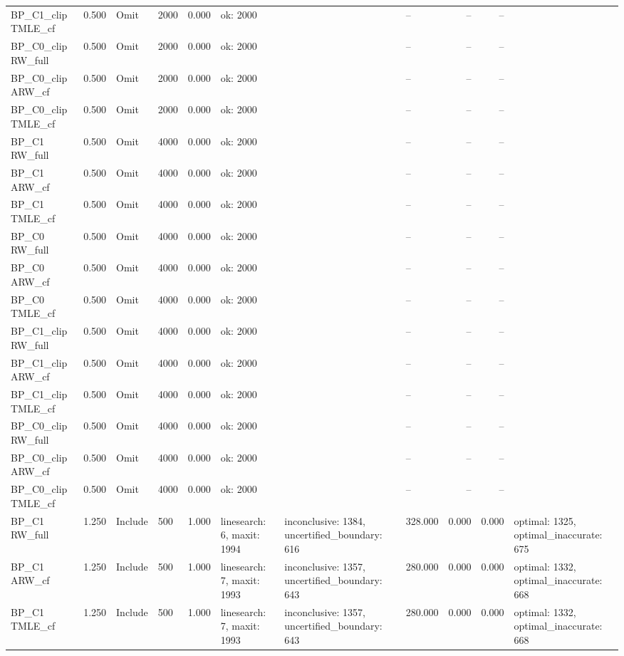 \begin{tabular}{llllrlllrrl}
BP\_C1\_clip TMLE\_cf & 0.500 & Omit & 2000 & 0.000 & ok: 2000 &  & -- & -- & -- &  \\
BP\_C0\_clip RW\_full & 0.500 & Omit & 2000 & 0.000 & ok: 2000 &  & -- & -- & -- &  \\
BP\_C0\_clip ARW\_cf & 0.500 & Omit & 2000 & 0.000 & ok: 2000 &  & -- & -- & -- &  \\
BP\_C0\_clip TMLE\_cf & 0.500 & Omit & 2000 & 0.000 & ok: 2000 &  & -- & -- & -- &  \\
BP\_C1 RW\_full & 0.500 & Omit & 4000 & 0.000 & ok: 2000 &  & -- & -- & -- &  \\
BP\_C1 ARW\_cf & 0.500 & Omit & 4000 & 0.000 & ok: 2000 &  & -- & -- & -- &  \\
BP\_C1 TMLE\_cf & 0.500 & Omit & 4000 & 0.000 & ok: 2000 &  & -- & -- & -- &  \\
BP\_C0 RW\_full & 0.500 & Omit & 4000 & 0.000 & ok: 2000 &  & -- & -- & -- &  \\
BP\_C0 ARW\_cf & 0.500 & Omit & 4000 & 0.000 & ok: 2000 &  & -- & -- & -- &  \\
BP\_C0 TMLE\_cf & 0.500 & Omit & 4000 & 0.000 & ok: 2000 &  & -- & -- & -- &  \\
BP\_C1\_clip RW\_full & 0.500 & Omit & 4000 & 0.000 & ok: 2000 &  & -- & -- & -- &  \\
BP\_C1\_clip ARW\_cf & 0.500 & Omit & 4000 & 0.000 & ok: 2000 &  & -- & -- & -- &  \\
BP\_C1\_clip TMLE\_cf & 0.500 & Omit & 4000 & 0.000 & ok: 2000 &  & -- & -- & -- &  \\
BP\_C0\_clip RW\_full & 0.500 & Omit & 4000 & 0.000 & ok: 2000 &  & -- & -- & -- &  \\
BP\_C0\_clip ARW\_cf & 0.500 & Omit & 4000 & 0.000 & ok: 2000 &  & -- & -- & -- &  \\
BP\_C0\_clip TMLE\_cf & 0.500 & Omit & 4000 & 0.000 & ok: 2000 &  & -- & -- & -- &  \\
BP\_C1 RW\_full & 1.250 & Include & 500 & 1.000 & linesearch: 6, maxit: 1994 & inconclusive: 1384, uncertified\_boundary: 616 & 328.000 & 0.000 & 0.000 & optimal: 1325, optimal\_inaccurate: 675 \\
BP\_C1 ARW\_cf & 1.250 & Include & 500 & 1.000 & linesearch: 7, maxit: 1993 & inconclusive: 1357, uncertified\_boundary: 643 & 280.000 & 0.000 & 0.000 & optimal: 1332, optimal\_inaccurate: 668 \\
BP\_C1 TMLE\_cf & 1.250 & Include & 500 & 1.000 & linesearch: 7, maxit: 1993 & inconclusive: 1357, uncertified\_boundary: 643 & 280.000 & 0.000 & 0.000 & optimal: 1332, optimal\_inaccurate: 668 \\

\end{tabular}

